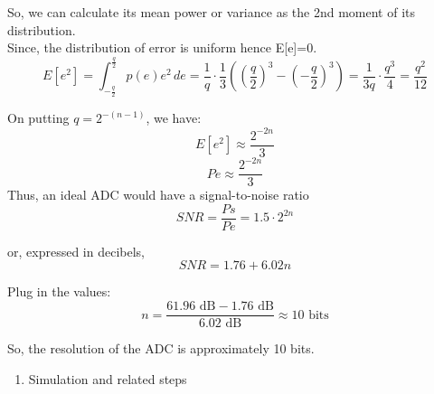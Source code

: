 \documentclass[journal,12pt,onecolumn]{IEEEtran}
\begin{document}
So, we can calculate its mean power or variance as the 2nd moment of its distribution.\\
Since, the distribution of error is uniform hence E[e]=0.
\begin{equation}
E[e^{2}] = \int_{-\frac{q}{2}}^{\frac{q}{2}} p(e) e^{2} \, de 
= \frac{1}{q} \cdot \frac{1}{3} \left(\left(\frac{q}{2}\right)^{3} - \left(-\frac{q}{2}\right)^{3}\right)
=\frac{1}{3q} \cdot \frac{q^{3}}{4}
=\frac{q^{2}}{12}
\end{equation}

On putting \(q = 2^{-(n-1)}\), we have:
\begin{equation}
E[e^{2}] \approx \frac{2^{-2n}}{3}
\end{equation}
\begin{equation}
Pe \approx \frac{2^{-2n}}{3}
\end{equation}
Thus, an ideal ADC would have a signal-to-noise ratio
\begin{equation}
SNR = \frac{Ps}{Pe} = 1.5 \cdot 2^{2n}
\end{equation}

or, expressed in decibels,
\begin{equation}
SNR = 1.76 + 6.02n
\end{equation}

Plug in the values:
\begin{equation}
n = \frac{61.96 \text{ dB} - 1.76 \text{ dB}}{6.02 \text{ dB}} \approx 10 \text{ bits}
\end{equation}

So, the resolution of the ADC is approximately 10 bits.\\

\begin{enumerate}
\item Simulation and related steps
\end{enumerate}
\end{document}
